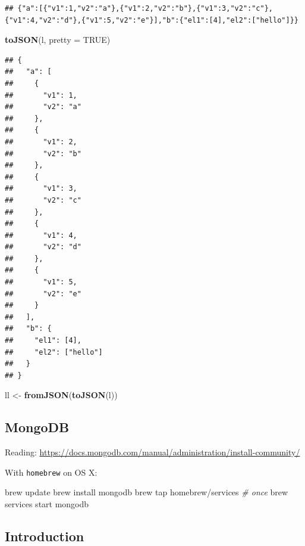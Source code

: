 \documentclass[]{book}
\newenvironment{Shaded}{\begin{snugshade}}{\end{snugshade}}
\newcommand{\KeywordTok}[1]{\textcolor[rgb]{0.13,0.29,0.53}{\textbf{#1}}}
\newcommand{\DataTypeTok}[1]{\textcolor[rgb]{0.13,0.29,0.53}{#1}}
\newcommand{\StringTok}[1]{\textcolor[rgb]{0.31,0.60,0.02}{#1}}
\newcommand{\CommentTok}[1]{\textcolor[rgb]{0.56,0.35,0.01}{\textit{#1}}}
\newcommand{\OtherTok}[1]{\textcolor[rgb]{0.56,0.35,0.01}{#1}}
\newcommand{\ExtensionTok}[1]{#1}
\newcommand{\NormalTok}[1]{#1}
\theoremstyle{definition}
\theoremstyle{definition}
\theoremstyle{definition}
\theoremstyle{remark}
\begin{document}
\begin{verbatim}
## {"a":[{"v1":1,"v2":"a"},{"v1":2,"v2":"b"},{"v1":3,"v2":"c"},{"v1":4,"v2":"d"},{"v1":5,"v2":"e"}],"b":{"el1":[4],"el2":["hello"]}}
\end{verbatim}

\begin{Shaded}
\begin{Highlighting}[]
\KeywordTok{toJSON}\NormalTok{(l, }\DataTypeTok{pretty =} \OtherTok{TRUE}\NormalTok{)}
\end{Highlighting}
\end{Shaded}

\begin{verbatim}
## {
##   "a": [
##     {
##       "v1": 1,
##       "v2": "a"
##     },
##     {
##       "v1": 2,
##       "v2": "b"
##     },
##     {
##       "v1": 3,
##       "v2": "c"
##     },
##     {
##       "v1": 4,
##       "v2": "d"
##     },
##     {
##       "v1": 5,
##       "v2": "e"
##     }
##   ],
##   "b": {
##     "el1": [4],
##     "el2": ["hello"]
##   }
## }
\end{verbatim}

\begin{Shaded}
\begin{Highlighting}[]
\NormalTok{ll <-}\StringTok{ }\KeywordTok{fromJSON}\NormalTok{(}\KeywordTok{toJSON}\NormalTok{(l))}
\end{Highlighting}
\end{Shaded}

\subsection{MongoDB}\label{mongodb}

Reading:
\url{https://docs.mongodb.com/manual/administration/install-community/}

With \texttt{homebrew} on OS X:

\begin{Shaded}
\begin{Highlighting}[]
\ExtensionTok{brew}\NormalTok{ update}
\ExtensionTok{brew}\NormalTok{ install mongodb}
\ExtensionTok{brew}\NormalTok{ tap homebrew/services }\CommentTok{# once}
\ExtensionTok{brew}\NormalTok{ services start mongodb}
\end{Highlighting}
\end{Shaded}

\subsection{Introduction}\label{introduction}
\end{document}
